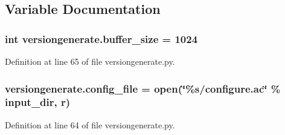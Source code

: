 \subsection{Variable Documentation}
\subsubsection[{\texorpdfstring{buffer\+\_\+size}{buffer_size}}]{\setlength{\rightskip}{0pt plus 5cm}int versiongenerate.\+buffer\+\_\+size = 1024}\hypertarget{namespaceversiongenerate_a5656c48d43f7e869041b6a30c124702e}{}\label{namespaceversiongenerate_a5656c48d43f7e869041b6a30c124702e}


Definition at line 65 of file versiongenerate.\+py.

\subsubsection[{\texorpdfstring{config\+\_\+file}{config_file}}]{\setlength{\rightskip}{0pt plus 5cm}versiongenerate.\+config\+\_\+file = open(\char`\"{}\%s/configure.\+ac\char`\"{} \% input\+\_\+dir, \textquotesingle{}r\textquotesingle{})}\hypertarget{namespaceversiongenerate_afdfd8d6de9b62e742923b2b3326798e6}{}\label{namespaceversiongenerate_afdfd8d6de9b62e742923b2b3326798e6}


Definition at line 64 of file versiongenerate.\+py.

